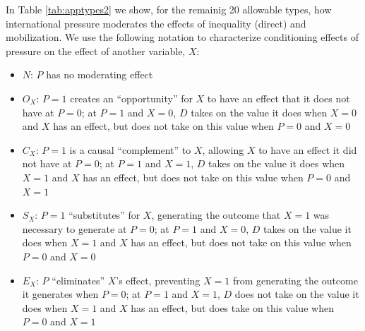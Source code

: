 \documentclass[12pt,]{book}
\begin{document}
In Table \ref{tab:apptypes2} we show, for the remainig 20 allowable types, how international pressure moderates the effects of inequality (direct) and mobilization. We use the following notation to characterize conditioning effects of pressure on the effect of another variable, \(X\):

\begin{itemize}
\item
  \(N\): \(P\) has no moderating effect
\item
  \(O_X\): \(P=1\) creates an ``opportunity'' for \(X\) to have an effect that it does not have at \(P=0\); at \(P=1\) and \(X=0\), \(D\) takes on the value it does when \(X=0\) and \(X\) has an effect, but does not take on this value when \(P=0\) and \(X=0\)
\item
  \(C_X\): \(P=1\) is a causal ``complement'' to \(X\), allowing \(X\) to have an effect it did not have at \(P=0\); at \(P=1\) and \(X=1\), \(D\) takes on the value it does when \(X=1\) and \(X\) has an effect, but does not take on this value when \(P=0\) and \(X=1\)
\item
  \(S_X\): \(P=1\) ``substitutes'' for \(X\), generating the outcome that \(X=1\) was necessary to generate at \(P=0\); at \(P=1\) and \(X=0\), \(D\) takes on the value it does when \(X=1\) and \(X\) has an effect, but does not take on this value when \(P=0\) and \(X=0\)
\item
  \(E_X\): \(P\) ``eliminates'' \(X\)'s effect, preventing \(X=1\) from generating the outcome it generates when \(P=0\); at \(P=1\) and \(X=1\), \(D\) does not take on the value it does when \(X=1\) and \(X\) has an effect, but does take on this value when \(P=0\) and \(X=1\)
\end{itemize}
\end{document}
